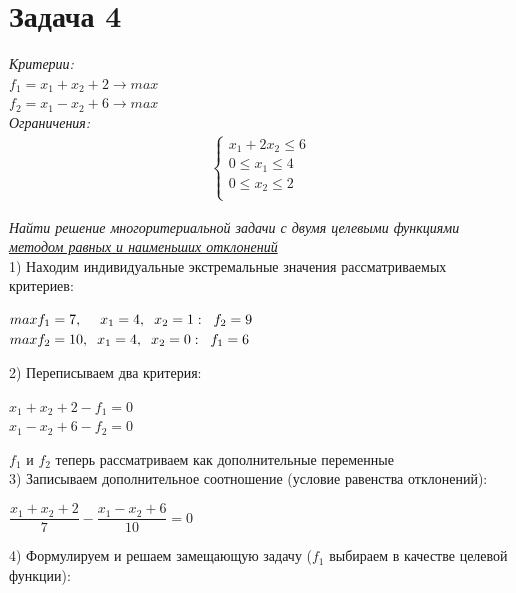\documentclass[14pt,fleqn]{extarticle}
\begin{document}
	\section*{Задача 4}
	\textit{Критерии:}\\
	$f_1 = x_1 + x_2 + 2 \longrightarrow max$\\
	$f_2 = x_1 - x_2 + 6 \longrightarrow max$\\
	
	\textit{Ограничения:}
	\begin{align*}
		\begin{cases}
			x_1 + 2x_2 \leq 6\\
			0 \leq x_1 \leq 4\\
			0 \leq x_2 \leq 2\\
		\end{cases}
	\end{align*}
	
	\textit{Найти решение многоритериальной задачи с двумя целевыми функциями \underline{методом равных и наименьших отклонений}}\\
	
	1) Находим индивидуальные экстремальные значения рассматриваемых критериев:
	\begin{center}
		$max f_1 = 7, \hspace{0.45cm} x_1 = 4, \hspace{0.2cm} x_2 = 1: \hspace{0.2cm} f_2 = 9$\\
		$max f_2 = 10, \hspace{0.2cm} x_1 = 4, \hspace{0.2cm} x_2 = 0: \hspace{0.2cm} f_1 = 6$
	\end{center}

	2) Переписываем два критерия:
	\begin{center}
		$x_1 + x_2 + 2 - f_1 = 0$\\
		$x_1 - x_2 + 6 - f_2 = 0$
	\end{center}
	$f_1$ и $f_2$ теперь рассматриваем как дополнительные переменные\\
	
	3) Записываем дополнительное соотношение (условие равенства отклонений):
	\begin{center}
		$\dfrac{x_1 + x_2 + 2}{7} - \dfrac{x_1 - x_2 + 6}{10} = 0$
	\end{center}

	\newpage
	
	4) Формулируем и решаем замещающую задачу ($f_1$ выбираем в качестве целевой функции):\\
	
\end{document}
